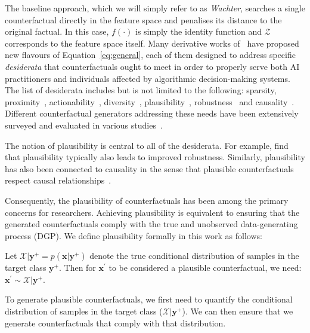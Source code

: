 The baseline approach, which we will simply refer to as \textit{Wachter}, searches a single counterfactual directly in the feature space and penalises its distance to the original factual. In this case, $f(\cdot)$ is simply the identity function and $\mathcal{Z}$ corresponds to the feature space itself. Many derivative works of~\citet{wachter2017counterfactual} have proposed new flavours of Equation~\ref{eq:general}, each of them designed to address specific \textit{desiderata} that counterfactuals ought to meet in order to properly serve both AI practitioners and individuals affected by algorithmic decision-making systems. The list of desiderata includes but is not limited to the following: sparsity, proximity~\citep{wachter2017counterfactual}, actionability~\citep{ustun2019actionable}, diversity~\citep{mothilal2020explaining}, plausibility~\citep{joshi2019realistic,poyiadzi2020face,schut2021generating}, robustness~\citep{upadhyay2021robust,pawelczyk2022probabilistically,altmeyer2023endogenous} and causality~\citep{karimi2021algorithmic}. Different counterfactual generators addressing these needs have been extensively surveyed and evaluated in various studies~\citep{verma2020counterfactual,karimi2020survey,pawelczyk2021carla,artelt2021evaluating,guidotti2022counterfactual}. 

The notion of plausibility is central to all of the desiderata. For example, \citet{artelt2021evaluating} find that plausibility typically also leads to improved robustness. Similarly, plausibility has also been connected to causality in the sense that plausible counterfactuals respect causal relationships~\citep{mahajan2019preserving}. 

Consequently, the plausibility of counterfactuals has been among the primary concerns for researchers. Achieving plausibility is equivalent to ensuring that the generated counterfactuals comply with the true and unobserved data-generating process (DGP). We define plausibility formally in this work as follows:

\begin{definition}
  \label{def:plausible}
  Let $\mathcal{X}|\mathbf{y}^+= p(\mathbf{x}|\mathbf{y}^+)$ denote the true conditional distribution of samples in the target class $\mathbf{y}^+$. Then for $\mathbf{x}^{\prime}$ to be considered a plausible counterfactual, we need: $\mathbf{x}^{\prime} \sim \mathcal{X}|\mathbf{y}^+$.
\end{definition}

To generate plausible counterfactuals, we first need to quantify the conditional distribution of samples in the target class ($\mathcal{X}|\mathbf{y}^+$). We can then ensure that we generate counterfactuals that comply with that distribution.

